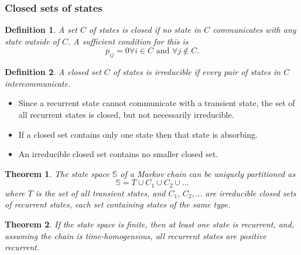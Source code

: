 \documentclass{article}
\newtheorem{theorem}{Theorem}
\newtheorem{definition}{Definition}
\begin{document}
\subsubsection{Closed sets of states}
\begin{definition}
    A set $C$ of states is closed if no state in $C$ communicates with any state outside of $C$. A sufficient condition for this is
    \begin{equation}
        p_{ij} = 0 \forall i\in C \text{ and } \forall j\notin C.
    \end{equation}
\end{definition}
\begin{definition}
    A closed set $C$ of states is irreducible if every pair of states in $C$ intercommunicate.
\end{definition}
\begin{itemize}
    \item Since a recurrent state cannot communicate with a transient state, the set of all recurrent states is closed, but not necessarily irreducible.
    \item If a closed set contains only one state then that state is absorbing.
    \item An irreducible closed set contains no smaller closed set.
\end{itemize}

\begin{theorem}
    The state space $\mathbb{S}$ of a Markov chain can be uniquely partitioned as
    \begin{equation}
        \mathbb{S} = T\cup C_1\cup C_2\cup\ldots \nonumber
    \end{equation}
    where $T$ is the set of all transient states, and $C_1,\,C_2,\ldots$ are irreducible closed sets of recurrent states, each set containing states of the same type. 
\end{theorem}
\begin{theorem}
    If the state space is finite, then at least one state is recurrent, and, assuming the chain is time-homogeneous, all recurrent states are positive recurrent.
\end{theorem}
\end{document}
